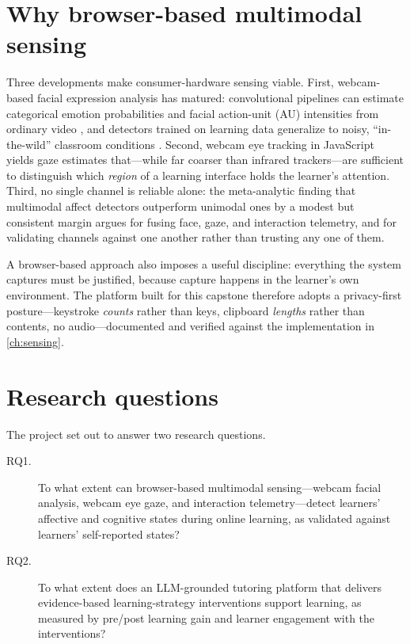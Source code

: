 \section{Why browser-based multimodal sensing}
\label{sec:intro-browser}

Three developments make consumer-hardware sensing viable. First,
webcam-based facial expression analysis has matured: convolutional
pipelines can estimate categorical emotion probabilities and facial
action-unit (AU) intensities from ordinary video
\citep{mollahosseini2019affectnet, cheong2023pyfeat,
baltrusaitis2018openface}, and detectors trained on learning data
generalize to noisy, ``in-the-wild'' classroom conditions
\citep{bosch2015, bosch2016}. Second, webcam eye tracking in JavaScript
\citep{papoutsaki2016webgazer} yields gaze estimates that---while far
coarser than infrared trackers---are sufficient to distinguish which
\emph{region} of a learning interface holds the learner's attention.
Third, no single channel is reliable alone: the meta-analytic finding that
multimodal affect detectors outperform unimodal ones by a modest but
consistent margin \citep{dmello2015review} argues for fusing face, gaze,
and interaction telemetry, and for validating channels against one
another rather than trusting any one of them.

A browser-based approach also imposes a useful discipline: everything the
system captures must be justified, because capture happens in the
learner's own environment. The platform built for this capstone therefore
adopts a privacy-first posture---keystroke \emph{counts} rather than keys,
clipboard \emph{lengths} rather than contents, no audio---documented and
verified against the implementation in \cref{ch:sensing}.

\section{Research questions}
\label{sec:intro-rqs}

The project set out to answer two research questions.


\begin{description}
  \item[RQ1.] To what extent can browser-based multimodal sensing---webcam
  facial analysis, webcam eye gaze, and interaction telemetry---detect
  learners' affective and cognitive states during online learning, as
  validated against learners' self-reported states?
  \item[RQ2.] To what extent does an LLM-grounded tutoring platform that
  delivers evidence-based learning-strategy interventions support
  learning, as measured by pre/post learning gain and learner engagement
  with the interventions?
\end{description}

